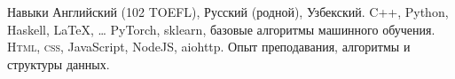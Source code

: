 
\begin{rubric}{Навыки}
\entry*[Языки]
	Английский (102 TOEFL), Русский (родной), Узбекский.
\entry*[ЯП\hfill]
	C++, Python, Haskell, \LaTeX, \ldots
\entry*[ML\hfill]
	PyTorch, sklearn, базовые алгоритмы машинного обучения.
\entry*[Веб]
	\textsc{Html, css}, JavaScript, NodeJS, aiohttp.
\entry*[Разное]
	Опыт преподавания, алгоритмы и структуры данных.
\end{rubric}
